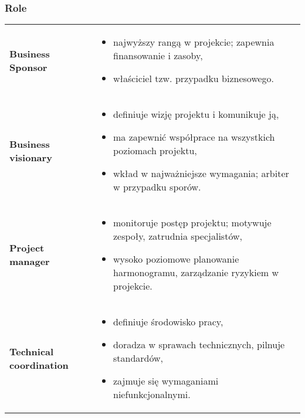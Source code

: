 \documentclass[a4paper]{article}
\begin{document}
    \subsubsection{Role}
    \begin{table}[H]
        \begin{center}
            \begin{tabular}{ p{} p{} }
                \textbf{Business Sponsor}
                &
                \begin{itemize}
                    \item najwyższy rangą w projekcie; zapewnia finansowanie i zasoby,
                    \item właściciel tzw. przypadku biznesowego.
                \end{itemize}
                \\


                \textbf{Business visionary}
                &
                \begin{itemize}
                    \item definiuje wizję projektu i komunikuje ją,
                    \item ma zapewnić współprace na wszystkich poziomach projektu,
                    \item wkład w najważniejsze wymagania; arbiter w przypadku sporów.
                \end{itemize}
                \\

                \textbf{Project manager}
                &
                \begin{itemize}
                    \item monitoruje postęp projektu; motywuje zespoły, zatrudnia specjalistów,
                    \item wysoko poziomowe planowanie harmonogramu, zarządzanie ryzykiem w projekcie.
                \end{itemize}
                \\

                \textbf{Technical coordination}
                &
                \begin{itemize}
                    \item definiuje środowisko pracy,
                    \item doradza w sprawach technicznych, pilnuje standardów,
                    \item zajmuje się wymaganiami niefunkcjonalnymi.
                \end{itemize}
                \\


\end{tabular}
\end{center}
\end{table}
\end{document}
